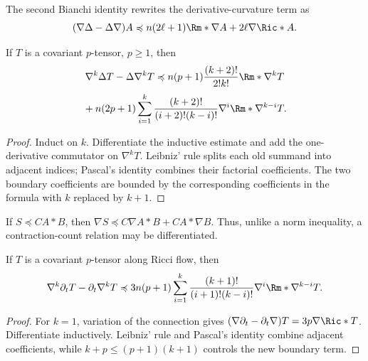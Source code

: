\begin{remark}
\label{rem:chow-ii-nabla-laplacian-bianchi-form}
The second Bianchi identity rewrites the derivative-curvature term as
\[
 (\nabla\Delta-\Delta\nabla)A
 \preccurlyeq n(2\ell+1)\Rm*\nabla A+2\ell\nabla\Ric*A.
\]
\end{remark}

\begin{lemma}
\label{lem:chow-ii-higher-nabla-laplacian-commutator}
If \(T\) is a covariant \(p\)-tensor, \(p\geq1\), then
\[
 \nabla^k\Delta T-\Delta\nabla^kT
 \preccurlyeq n(p+1)\frac{(k+2)!}{2!k!}\Rm*\nabla^kT
\]
\[
 {}+n(2p+1)\sum_{i=1}^k
 \frac{(k+2)!}{(i+2)!(k-i)!}\nabla^i\Rm*\nabla^{k-i}T.
\]
\end{lemma}
\begin{proof}
\sketch
{}
Induct on \(k\).  Differentiate the inductive estimate and add the
one-derivative commutator on \(\nabla^kT\).  Leibniz' rule splits each old
summand into adjacent indices; Pascal's identity combines their factorial
coefficients.  The two boundary coefficients are bounded by the corresponding
coefficients in the formula with \(k\) replaced by \(k+1\).
\end{proof}

\begin{remark}
\label{rem:chow-ii-differentiable-contraction-count}
If \(S\preccurlyeq C A*B\), then
\(\nabla S\preccurlyeq C\nabla A*B+C A*\nabla B\).  Thus, unlike a norm
inequality, a contraction-count relation may be differentiated.
\end{remark}

\begin{lemma}
\label{lem:chow-ii-nabla-time-commutator}
If \(T\) is a covariant \(p\)-tensor along Ricci flow, then
\[
 \nabla^k\partial_tT-\partial_t\nabla^kT
 \preccurlyeq3n(p+1)\sum_{i=1}^k
 \frac{(k+1)!}{(i+1)!(k-i)!}\nabla^i\Rm*\nabla^{k-i}T.
\]
\end{lemma}
\begin{proof}
\sketch
For \(k=1\), variation of the connection gives
\((\nabla\partial_t-\partial_t\nabla)T=3p\nabla\Ric*T\).  Differentiate
inductively.  Leibniz' rule and Pascal's identity combine adjacent
coefficients, while \(k+p\leq(p+1)(k+1)\) controls the new boundary term.
\end{proof}

